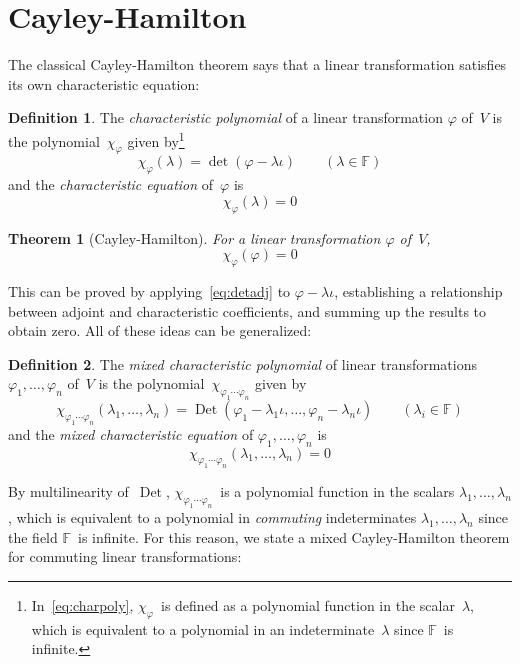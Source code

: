 \documentclass[letterpaper]{article}
\newcommand{\F}{\mathbb{F}}
\DeclareMathOperator{\Det}{Det}
\theoremstyle{definition}
\newtheorem{defn}{Definition}
\theoremstyle{plain}
\newtheorem{thm}{Theorem}
\begin{document}
\section*{Cayley-Hamilton}
The classical Cayley-Hamilton theorem says that a linear transformation satisfies its own characteristic equation:
\begin{defn}
The \emph{characteristic polynomial} of a linear transformation \(\varphi\) of~\(V\) is the polynomial~\(\chi_{\varphi}\) given by\footnote{In~\eqref{eq:charpoly}, \(\chi_{\varphi}\)~is defined as a polynomial function in the scalar~\(\lambda\), which is equivalent to a polynomial in an indeterminate~\(\lambda\) since \(\F\)~is infinite.}
\begin{equation}
\chi_{\varphi}(\lambda)=\det(\varphi-\lambda\iota)\qquad(\lambda\in\F)\label{eq:charpoly}
\end{equation}
and the \emph{characteristic equation} of~\(\varphi\) is
\begin{equation}
\chi_{\varphi}(\lambda)=0\label{eq:char}
\end{equation}
\end{defn}
\begin{thm}[Cayley-Hamilton]
For a linear transformation \(\varphi\) of~\(V\),
\begin{equation}
\chi_{\varphi}(\varphi)=0\label{eq:ch}
\end{equation}
\end{thm}
\noindent This can be proved by applying~\eqref{eq:detadj} to \(\varphi-\lambda\iota\), establishing a relationship between adjoint and characteristic coefficients, and summing up the results to obtain zero. All of these ideas can be generalized:
\begin{defn}
The \emph{mixed characteristic polynomial} of linear transformations \(\varphi_1,\ldots,\varphi_n\) of~\(V\) is the polynomial~\(\chi_{\varphi_1\cdots\varphi_n}\) given by
\begin{equation}
\chi_{\varphi_1\cdots\varphi_n}(\lambda_1,\ldots,\lambda_n)=\Det(\varphi_1-\lambda_1\iota,\ldots,\varphi_n-\lambda_n\iota)\qquad(\lambda_i\in\F)\label{eq:mcharpoly}
\end{equation}
and the \emph{mixed characteristic equation} of \(\varphi_1,\ldots,\varphi_n\) is
\begin{equation}
\chi_{\varphi_1\cdots\varphi_n}(\lambda_1,\ldots,\lambda_n)=0\label{eq:mchar}
\end{equation}
\end{defn}
\noindent By multilinearity of~\(\Det\), \(\chi_{\varphi_1\cdots\varphi_n}\)~is a polynomial function in the scalars \(\lambda_1,\ldots,\lambda_n\), which is equivalent to a polynomial in \emph{commuting} indeterminates \(\lambda_1,\ldots,\lambda_n\) since the field \(\F\)~is infinite. For this reason, we state a mixed Cayley-Hamilton theorem for commuting linear transformations:
\end{document}
